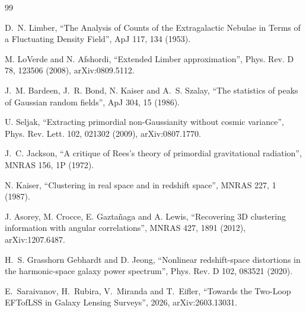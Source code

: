 \documentclass[11pt]{article}
\begin{document}
\begin{thebibliography}{99}

D.~N. Limber,
``The Analysis of Counts of the Extragalactic Nebulae in Terms of a
Fluctuating Density Field'',
ApJ 117, 134 (1953).

M. LoVerde and N. Afshordi,
``Extended Limber approximation'',
Phys. Rev. D 78, 123506 (2008), arXiv:0809.5112.

J.~M. Bardeen, J.~R. Bond, N. Kaiser and A.~S. Szalay,
``The statistics of peaks of Gaussian random fields'',
ApJ 304, 15 (1986).

U. Seljak,
``Extracting primordial non-Gaussianity without cosmic variance'',
Phys. Rev. Lett. 102, 021302 (2009), arXiv:0807.1770.

J.~C. Jackson,
``A critique of Rees's theory of primordial gravitational radiation'',
MNRAS 156, 1P (1972).

N. Kaiser,
``Clustering in real space and in redshift space'',
MNRAS 227, 1 (1987).

J. Asorey, M. Crocce, E. Gazta\~naga and A. Lewis,
``Recovering 3D clustering information with angular correlations'',
MNRAS 427, 1891 (2012), arXiv:1207.6487.

H.~S. Grasshorn Gebhardt and D. Jeong,
``Nonlinear redshift-space distortions in the harmonic-space galaxy
power spectrum'',
Phys. Rev. D 102, 083521 (2020).

E.~Saraivanov, H.~Rubira, V.~Miranda and T.~Eifler,
``Towards the Two-Loop EFTofLSS in Galaxy Lensing Surveys'',
2026, arXiv:2603.13031.

\end{thebibliography}
\end{document}

